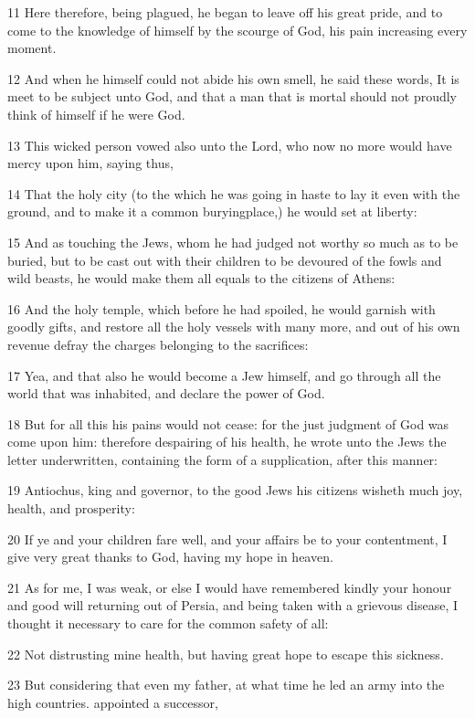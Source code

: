 \par 11 Here therefore, being plagued, he began to leave off his great pride, and to come to the knowledge of himself by the scourge of God, his pain increasing every moment.
\par 12 And when he himself could not abide his own smell, he said these words, It is meet to be subject unto God, and that a man that is mortal should not proudly think of himself if he were God.
\par 13 This wicked person vowed also unto the Lord, who now no more would have mercy upon him, saying thus,
\par 14 That the holy city (to the which he was going in haste to lay it even with the ground, and to make it a common buryingplace,) he would set at liberty:
\par 15 And as touching the Jews, whom he had judged not worthy so much as to be buried, but to be cast out with their children to be devoured of the fowls and wild beasts, he would make them all equals to the citizens of Athens:
\par 16 And the holy temple, which before he had spoiled, he would garnish with goodly gifts, and restore all the holy vessels with many more, and out of his own revenue defray the charges belonging to the sacrifices:
\par 17 Yea, and that also he would become a Jew himself, and go through all the world that was inhabited, and declare the power of God.
\par 18 But for all this his pains would not cease: for the just judgment of God was come upon him: therefore despairing of his health, he wrote unto the Jews the letter underwritten, containing the form of a supplication, after this manner:
\par 19 Antiochus, king and governor, to the good Jews his citizens wisheth much joy, health, and prosperity:
\par 20 If ye and your children fare well, and your affairs be to your contentment, I give very great thanks to God, having my hope in heaven.
\par 21 As for me, I was weak, or else I would have remembered kindly your honour and good will returning out of Persia, and being taken with a grievous disease, I thought it necessary to care for the common safety of all:
\par 22 Not distrusting mine health, but having great hope to escape this sickness.
\par 23 But considering that even my father, at what time he led an army into the high countries. appointed a successor,
